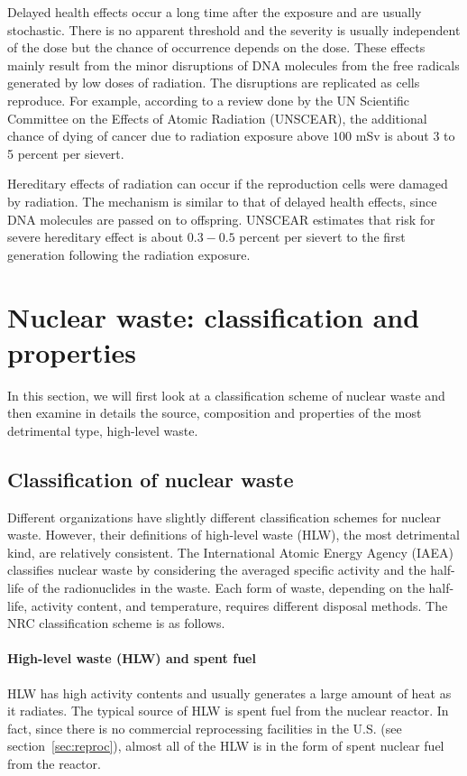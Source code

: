 \documentclass[nofootinbib,preprint,aps]{revtex4-1}
\begin{document}
        Delayed health effects occur a long time after the exposure and are usually stochastic. There is
        no apparent threshold and the severity is usually independent of the dose but
        the chance of occurrence depends on the dose.\cite{u16}
        These effects mainly result from the minor disruptions of DNA molecules from the free radicals generated
        by low doses of radiation. The disruptions are replicated
        as cells reproduce.
        For example, according to a review done by the UN Scientific Committee on the Effects of Atomic Radiation
        (UNSCEAR), the additional chance of dying of cancer due to radiation exposure above $100$ mSv is
        about 3 to 5 percent per sievert.\cite{unscear16}

        Hereditary effects of radiation can occur if the reproduction cells were damaged by radiation.
        The mechanism is similar to that of delayed health effects, since DNA molecules are passed on
        to offspring.
        UNSCEAR estimates that risk for severe hereditary effect is about $0.3-0.5$ percent per sievert to
        the first generation following the radiation exposure.\cite{u16, unscear16}
\section{Nuclear waste: classification and properties}
\label{sec:waste}
    In this section, we will first look at a classification scheme of nuclear waste and then
    examine in details the source, composition and properties of the most detrimental type, high-level waste.
    \subsection{Classification of nuclear waste}
    \label{sec:waste:classification}
    Different organizations have slightly different classification schemes for nuclear waste.
    However, their definitions of high-level waste (HLW), the most detrimental kind, are relatively consistent.
    The International Atomic Energy Agency (IAEA) classifies nuclear waste by considering the averaged specific activity
    and the half-life of the radionuclides in the waste.\cite{iaea09}
    Each form of waste, depending on the half-life, activity content, and temperature, requires different
    disposal methods. The NRC classification scheme is as follows.\cite{nrc09}

    \paragraph{High-level waste (HLW) and spent fuel}
    HLW has high activity contents and usually generates a large amount of
    heat as it radiates. The typical source of HLW is spent fuel from the nuclear reactor.
    In fact, since there is no commercial reprocessing facilities in the U.S. (see section~\ref{sec:reproc}),
    almost all of the HLW is in the form of spent nuclear fuel from the reactor.
\end{document}
